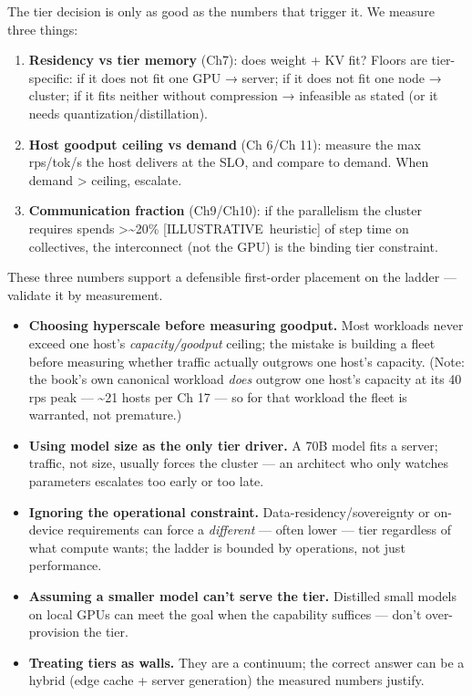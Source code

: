 \label{measurement}


The tier decision is only as good as the numbers that trigger it. We
measure three things:

\begin{enumerate}
\def\labelenumi{\arabic{enumi}.}
\tightlist
\item
  \textbf{Residency vs tier memory} (Ch7): does weight + KV fit? Floors
  are tier-specific: if it does not fit one GPU → server; if it does not
  fit one node → cluster; if it fits neither without compression →
  infeasible as stated (or it needs quantization/distillation).
\item
  \textbf{Host goodput ceiling vs demand} (Ch 6/Ch 11): measure the max
  rps/tok/s the host delivers at the SLO, and compare to demand. When
  demand \textgreater{} ceiling, escalate.
\item
  \textbf{Communication fraction} (Ch9/Ch10): if the parallelism the
  cluster requires spends \textgreater\textasciitilde20\%
  \mbox{{[}ILLUSTRATIVE heuristic{]}} of step time on collectives, the
  interconnect (not the GPU) is the binding tier constraint.
\end{enumerate}

These three numbers support a defensible first-order placement on the
ladder --- validate it by measurement.

\label{common-mistakes}


\begin{itemize}
\tightlist
\item
  \textbf{Choosing hyperscale before measuring goodput.} Most workloads
  never exceed one host's \emph{capacity/goodput} ceiling; the mistake
  is building a fleet before measuring whether traffic actually outgrows
  one host's capacity. (Note: the book's own canonical workload
  \emph{does} outgrow one host's capacity at its 40 rps peak ---
  \textasciitilde21 hosts per Ch 17 --- so for that workload the fleet
  is warranted, not premature.)
\item
  \textbf{Using model size as the only tier driver.} A 70B model fits a
  server; traffic, not size, usually forces the cluster --- an architect
  who only watches parameters escalates too early or too late.
\item
  \textbf{Ignoring the operational constraint.}
  Data-residency/sovereignty or on-device requirements can force a
  \emph{different} --- often lower --- tier regardless of what compute
  wants; the ladder is bounded by operations, not just performance.
\item
  \textbf{Assuming a smaller model can't serve the tier.} Distilled
  small models on local GPUs can meet the goal when the capability
  suffices --- don't over-provision the tier.
\item
  \textbf{Treating tiers as walls.} They are a continuum; the correct
  answer can be a hybrid (edge cache + server generation) the measured
  numbers justify.
\end{itemize}

